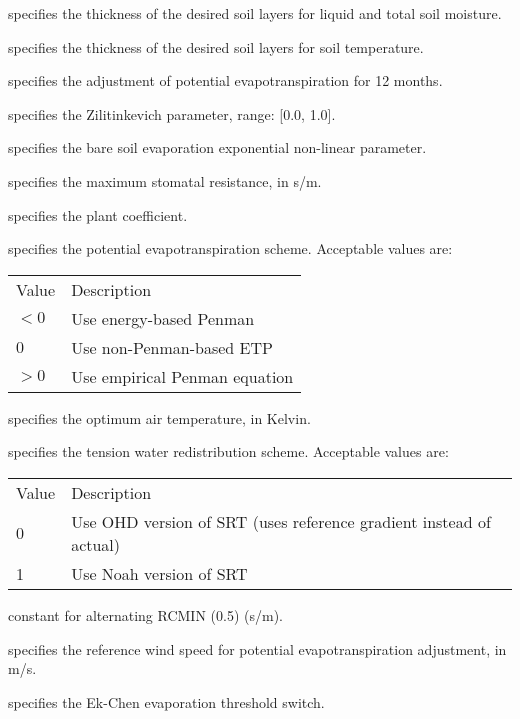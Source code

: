   specifies the thickness of the desired
 soil layers for liquid and total soil moisture.

  specifies the thickness of the desired
 soil layers for soil temperature.

  specifies the adjustment of
 potential evapotranspiration for 12 months.

  specifies the Zilitinkevich parameter,
 range: [0.0, 1.0].

  specifies the bare soil evaporation
 exponential non-linear parameter.

  specifies the maximum stomatal
 resistance, in s/m.

  specifies the plant coefficient.

  specifies the potential
 evapotranspiration scheme.
 Acceptable values are:

 \begin{tabular}{ll}
 Value & Description                   \\
 $<0$  & Use energy-based Penman       \\
 $0$   & Use non-Penman-based ETP      \\
 $>0$  & Use empirical Penman equation \\
 \end{tabular}

  specifies the optimum air temperature,
 in Kelvin.

  specifies the tension water redistribution
 scheme.
 Acceptable values are:

 \begin{tabular}{ll}
 Value & Description             \\
 0     & Use OHD version of SRT (uses reference gradient instead
         of actual)              \\
 1     & Use Noah version of SRT \\
 \end{tabular}

  constant for alternating
 RCMIN (0.5) (s/m).

  specifies the reference wind speed
 for potential evapotranspiration adjustment, in m/s.

  specifies the Ek-Chen evaporation
 threshold switch.

